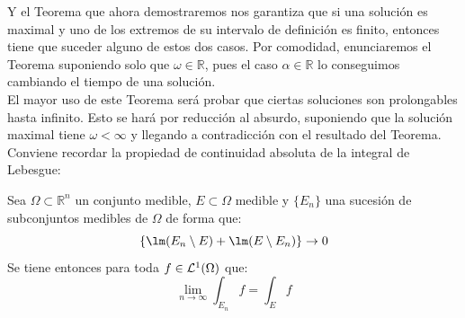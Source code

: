 \noindent
Y el Teorema que ahora demostraremos nos garantiza que si una solución es maximal y uno de los extremos de su intervalo de definición es finito, entonces tiene que suceder alguno de estos dos casos. Por comodidad, enunciaremos el Teorema suponiendo solo que $\omega \in \mathbb{R}$, pues el caso $\alpha\in \mathbb{R}$ lo conseguimos cambiando el tiempo de una solución.\\

\noindent
El mayor uso de este Teorema será probar que ciertas soluciones son prolongables hasta infinito. Esto se hará por reducción al absurdo, suponiendo que la solución maximal tiene $\omega<\infty$ y llegando a contradicción con el resultado del Teorema.\\

\noindent
Conviene recordar la propiedad de continuidad absoluta de la integral de Lebesgue:
\begin{teo}
    Sea $\Omega\subset \mathbb{R}^n$ un conjunto medible, $E\subset \Omega$ medible y $\{E_n\}$ una sucesión de subconjuntos medibles de $\Omega$ de forma que:
    \begin{equation*}
        \{\lm(E_n\setminus E) + \lm(E\setminus E_n)\} \to 0
    \end{equation*}
    Se tiene entonces para toda $f\in \mathcal{L}^1(\Omega)$ que:
    \begin{equation*}
        \lim_{n\to\infty}\int_{E_n}f = \int_E f
    \end{equation*}
\end{teo}

